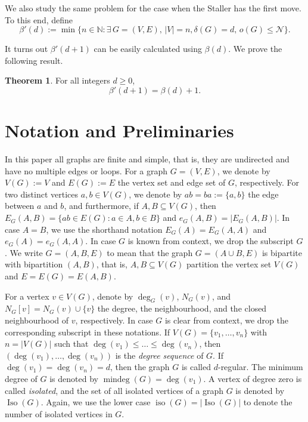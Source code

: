 \documentclass[a4paper,11pt,oneside]{scrartcl}
\theoremstyle{definition}
\newtheorem{theorem}[definition]{Theorem}
\theoremstyle{remark}
\DeclareMathOperator{\mindeg}{mindeg}
\DeclareMathOperator{\Iso}{Iso}
\DeclareMathOperator{\iso}{iso}
\begin{document}
We also study the same problem for the case when the Staller has the first move. To this end, define
\[
    \beta'(d):= \min \{ n \in \mathbb N:  \exists \,  G=(V,E), \,|V|=n, \delta(G)=d,\, o(G) \leq  \mathcal N \}.
\]

It turns out $\beta'(d+1)$ can be easily calculated using $\beta(d)$. We prove the following result.

\begin{theorem} \label{thm:beta'+1}
    For all integers $d \geq 0$,
    \[
        \beta'(d+1)= \beta(d)+1.
    \]
\end{theorem}




\section{Notation and Preliminaries}

In this paper all graphs are finite and simple, that is, they are undirected and have no multiple edges or loops. For a graph $G = (V,E)$, we denote by $V(G):=V$ and $E(G) := E$ the vertex set and edge set of $G$, respectively. For two distinct vertices $a, b \in V(G)$, we denote by $ab = ba := \{a,b\}$ the edge between $a$ and $b$, and furthermore, if $A, B \subseteq V(G)$, then $E_G(A,B) = \{ab \in E(G) : a \in A, b\in B\}$ and $e_G(A,B) = |E_G(A,B)|$. In case $A = B$, we use the shorthand notation $E_G(A) = E_G(A,A)$ and $e_G(A) = e_G(A, A)$. In case $G$ is known from context, we drop the subscript $G$. We write $G = (A, B, E)$ to mean that the graph $G = (A \cup B, E)$ is bipartite with bipartition $(A, B)$, that is, $A,B \subseteq V(G)$ partition the vertex set $V(G)$ and $E = E(G) = E(A,B)$.

For a vertex $v \in V(G)$, denote by $\deg_G(v)$, $N_G(v)$, and $N_{G}[v] = N_G(v) \cup \{v\}$ the degree, the neighbourhood, and the closed neighbourhood of $v$, respectively. In case $G$ is clear from context, we drop the corresponding subscript in these notations. If $V(G) = \{v_1,\dots, v_n\}$ with $n = |V(G)|$ such that $\deg(v_1) \leq \dots \leq \deg(v_n)$, then $(\deg(v_1), \dots, \deg(v_n))$ is the \emph{degree sequence} of $G$. If $\deg(v_1) = \deg(v_n) = d$, then the graph $G$ is called $d$-regular. The minimum degree of $G$ is denoted by $\mindeg(G) = \deg(v_1)$. A vertex of degree zero is called \emph{isolated}, and the set of all isolated vertices of a graph $G$ is denoted by $\Iso(G)$. Again, we use the lower case $\iso(G) = |\Iso(G)|$ to denote the number of isolated vertices in $G$. 
\end{document}
